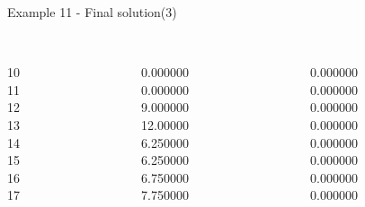\begin{frame}{Example 11 - Final solution(3)}
\footnotesize

\begin{columns}[t]
\begin{column}{0.3\textwidth}
\\
10\\
11\\
12\\
13\\
14\\
15\\
16\\
17\\

\end{column}
\begin{column}{0.3\textwidth}
\\
0.000000\\
0.000000\\
9.000000\\
12.00000\\
6.250000\\
6.250000\\
6.750000\\
7.750000\\

\end{column}  

\begin{column}{0.3\textwidth}
\\
0.000000\\
0.000000\\
0.000000\\
0.000000\\
0.000000\\
0.000000\\
0.000000\\
0.000000\\
\end{column}
\end{columns}  
\end{frame}

